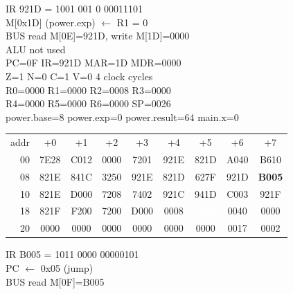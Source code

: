 \noindent\begin{tcolorbox}[stepbox, title={Step 30 \hfill PC 0E \quad ST R1, power.exp}]
\textcolor{dim}{IR} 921D = 1001 001 0 00011101\\
M[0x1D] (power.exp) $\leftarrow$ R1 = 0\\
\textcolor{dim}{BUS} read M[0E]=921D, \textcolor{wrt}{write M[1D]=0000}\\
\textcolor{dim}{ALU} \textcolor{dim}{not used}\\
PC=0F IR=921D MAR=1D MDR=0000\\
Z=1 N=0 C=1 V=0 \hfill \textcolor{dim}{4 clock cycles}\\
R0=0000 R1=0000 R2=0008 R3=0000\\
R4=0000 R5=0000 R6=0000 SP=0026\\
\textcolor{dim}{power.base=8  power.exp=0  power.result=64  main.x=0}\\[1pt]
{\setlength{\tabcolsep}{1.6pt}\begin{tabular}{@{}r*{8}{c}@{}}
\textcolor{dim}{addr} & \textcolor{dim}{+0} & \textcolor{dim}{+1} & \textcolor{dim}{+2} & \textcolor{dim}{+3} & \textcolor{dim}{+4} & \textcolor{dim}{+5} & \textcolor{dim}{+6} & \textcolor{dim}{+7}\\
\textcolor{dim}{00} & 7E28 & C012 & 0000 & 7201 & 921E & 821D & A040 & B610\\
\textcolor{dim}{08} & 821E & 841C & 3250 & 921E & 821D & 627F & 921D & \cellcolor{pcc}\textbf{B005}\\
\textcolor{dim}{10} & 821E & D000 & 7208 & 7402 & 921C & 941D & C003 & 921F\\
\textcolor{dim}{18} & 821F & F200 & 7200 & D000 & \cellcolor{datac}0008 & \cellcolor{wrt}\textcolor{white}{\textbf{0000}} & \cellcolor{datac}0040 & \cellcolor{datac}0000\\
\textcolor{dim}{20} & \cellcolor{stackc}0000 & \cellcolor{stackc}0000 & \cellcolor{stackc}0000 & \cellcolor{stackc}0000 & \cellcolor{stackc}0000 & \cellcolor{stackc}0000 & \cellcolor{stackc}0017 & \cellcolor{stackc}0002\\
\end{tabular}}
\end{tcolorbox}\hfill\begin{tcolorbox}[stepbox, title={Step 31 \hfill PC 0F \quad JMP power.while1}]
\textcolor{dim}{IR} B005 = 1011 0000 00000101\\
PC $\leftarrow$ 0x05 (jump)\\
\textcolor{dim}{BUS} read M[0F]=B005\\

\end{tcolorbox}
